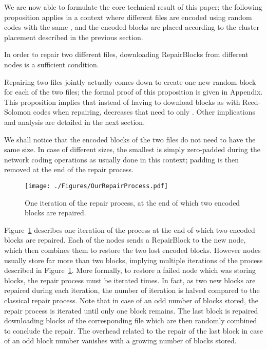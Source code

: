 We are now able to formulate the core technical result of this paper; the
following proposition applies in a context where different files are
encoded using random codes with the same , and the encoded blocks
are placed according to the cluster placement described in the
previous section.

\begin{prop} 
\label{prop1}
In order to repair two different files, downloading  RepairBlocks
from  different nodes is a sufficient condition.
\end{prop}

Repairing two files jointly actually comes down to create one new
random block for each of the two files; the formal proof of this
proposition is given in Appendix. This proposition implies that
instead of having to download  blocks as with Reed-Solomon codes
when repairing, \crc decreases that need to
only .  Other implications and analysis are detailed in the next section.

We shall notice that the encoded blocks of the two files do not need to have the same size. In case of different sizes, the smallest is simply zero-padded during the network coding operations as usually done in this context; padding is then removed at the end of the repair process.



\begin{figure}[t] 
\vspace{-0.5cm}
 \begin{center}    
 \texttt{[image: ./Figures/OurRepairProcess.pdf]} 
    \caption{One iteration of the repair process, at the end of which two encoded blocks are repaired.}   
    \label{ourRepairProcess}   
  \end{center}     
   \end{figure}

Figure~\ref{ourRepairProcess} describes one iteration of the process at the end of which two encoded blocks are repaired. Each of the  nodes sends a RepairBlock to the new node, which then combines them to restore the two lost encoded blocks. However nodes usually store far more than two blocks, implying multiple iterations of the process described in Figure~\ref{ourRepairProcess}.
More formally, to restore a failed node which was storing  blocks, the repair process must be iterated  times. In fact, as two new blocks are repaired during each iteration, the number of iteration is halved compared to the classical repair process.
Note that in case of an odd number of blocks stored, the repair process is iterated until only one block remains. The last block is repaired downloading  blocks of the corresponding file which are then randomly combined to conclude the repair. The overhead related to the repair of the last block in case of an odd block number vanishes with a growing number of blocks stored. 



